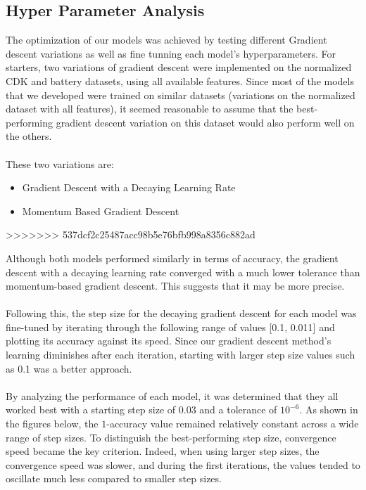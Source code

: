 \documentclass{article}
\begin{document}
\subsection{Hyper Parameter Analysis}
The optimization of our models was achieved by testing different Gradient descent variations as well as fine tunning each model’s hyperparameters.
For starters, two variations of gradient descent were implemented on the normalized CDK and battery datasets, using all available features. Since most of the models that we developed were trained on similar datasets (variations on the normalized dataset with all features), it seemed reasonable to assume that the best-performing gradient descent variation on this dataset would also perform well on the others.
\\
\\
These two variations are:
\begin{itemize}
  \item Gradient Descent with a Decaying Learning Rate
  \item Momentum Based Gradient Descent 
\end{itemize}
>>>>>>> 537dcf2c25487acc98b5e76bfb998a8356c882ad

Although both models performed similarly in terms of accuracy, the gradient descent with a decaying learning rate converged with a much lower tolerance than momentum-based gradient descent. This suggests that it may be more precise.
\\
\\
Following this, the step size for the decaying gradient descent for each model was fine-tuned by iterating through the following range of values [0.1, 0.011] and plotting its accuracy against its speed. Since our gradient descent method’s learning diminishes after each iteration, starting with larger step size values such as 0.1 was a better approach.
\\
\\
By analyzing the performance of each model, it was determined that they all worked best with a starting step size of 0.03 and a tolerance of \( 10^{-6} \). As shown in the figures below, the \( 1 \)-accuracy value remained relatively constant across a wide range of step sizes. To distinguish the best-performing step size, convergence speed became the key criterion. Indeed, when using larger step sizes, the convergence speed was slower, and during the first iterations, the values tended to oscillate much less compared to smaller step sizes.
\\
\\
\end{document}
